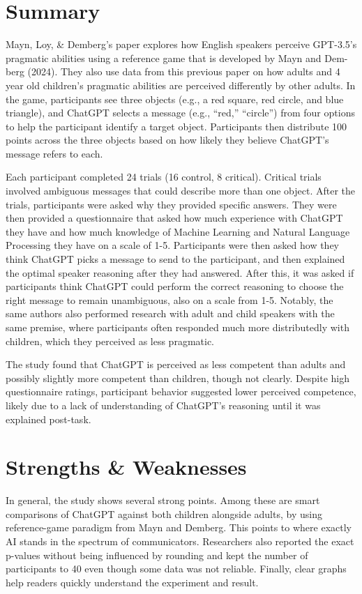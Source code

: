 \documentclass[12pt]{article}
\begin{document}
\section{Summary}
Mayn, Loy, \& Demberg's paper explores how English speakers perceive GPT-3.5’s pragmatic abilities using a reference game that is developed by Mayn and Dem-berg (2024). They also use data from this previous paper on how adults and 4 year old children's pragmatic abilities are perceived differently by other adults. In the game, participants see three objects (e.g., a red square, red circle, and blue triangle), and ChatGPT selects a message (e.g., “red,” “circle”) from four options to help the participant identify a target object. Participants then distribute 100 points across the three objects based on how likely they believe ChatGPT’s message refers to each.

Each participant completed 24 trials (16 control, 8 critical). Critical trials involved ambiguous messages that could describe more than one object. After the trials, participants were asked why they provided specific answers. They were then provided a questionnaire that asked how much experience with ChatGPT they have and how much knowledge of Machine Learning and Natural Language Processing they have on a scale of 1-5. Participants were then asked how they think ChatGPT picks a message to send to the participant, and then explained the optimal speaker reasoning after they had answered. After this, it was asked if participants think ChatGPT could perform the correct reasoning to choose the right message to remain unambiguous, also on a scale from 1-5. Notably, the same authors also performed research with adult and child speakers with the same premise, where participants often responded much more distributedly with children, which they perceived as less pragmatic.


The study found that ChatGPT is perceived as less competent than adults and possibly slightly more competent than children, though not clearly. Despite high questionnaire ratings, participant behavior suggested lower perceived competence, likely due to a lack of understanding of ChatGPT’s reasoning until it was explained post-task.


\section{Strengths \& Weaknesses}
In general, the study shows several strong points. Among these are smart comparisons of ChatGPT against both children alongside adults, by using reference-game paradigm from Mayn and Demberg. This points to where exactly AI stands in the spectrum of communicators. Researchers also reported the exact p-values without being influenced by rounding and kept the number of participants to 40 even though some data was not reliable. Finally, clear graphs help readers quickly understand the experiment and result.
\end{document}
